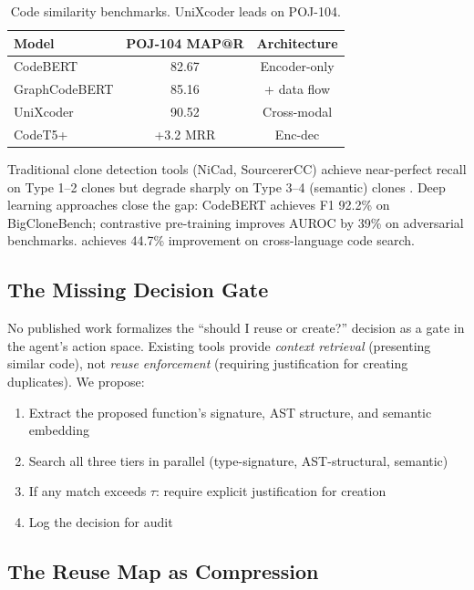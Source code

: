 \documentclass[11pt, a4paper, logo, copyright]{googledeepmind}
\begin{document}
\begin{table}[h]
\centering
\small
\begin{tabular}{lcc}
\toprule
\textbf{Model} & \textbf{POJ-104 MAP@R} & \textbf{Architecture} \\
\midrule
CodeBERT \citep{feng2020codebert} & 82.67 & Encoder-only \\
GraphCodeBERT \citep{guo2021graphcodebert} & 85.16 & + data flow \\
UniXcoder \citep{guo2022unixcoder} & 90.52 & Cross-modal \\
CodeT5+ \citep{wang2023codet5plus} & +3.2 MRR & Enc-dec \\
\bottomrule
\end{tabular}
\caption{Code similarity benchmarks. UniXcoder leads on POJ-104.}
\label{tab:embeddings}
\end{table}

Traditional clone detection tools (NiCad, SourcererCC) achieve near-perfect recall on Type 1--2 clones but degrade sharply on Type 3--4 (semantic) clones \citep{svajlenko2015bigclonebench}. Deep learning approaches close the gap: CodeBERT achieves F1 92.2\% on BigCloneBench; contrastive pre-training improves AUROC by 39\% on adversarial benchmarks. \citet{saieva2024reinforest} achieves 44.7\% improvement on cross-language code search.

\subsection{The Missing Decision Gate}

No published work formalizes the ``should I reuse or create?'' decision as a gate in the agent's action space. Existing tools provide \emph{context retrieval} (presenting similar code), not \emph{reuse enforcement} (requiring justification for creating duplicates). We propose:

\begin{enumerate}[nosep]
    \item Extract the proposed function's signature, AST structure, and semantic embedding
    \item Search all three tiers in parallel (type-signature, AST-structural, semantic)
    \item If any match exceeds $\tau$: require explicit justification for creation
    \item Log the decision for audit
\end{enumerate}

\subsection{The Reuse Map as Compression}
\end{document}
